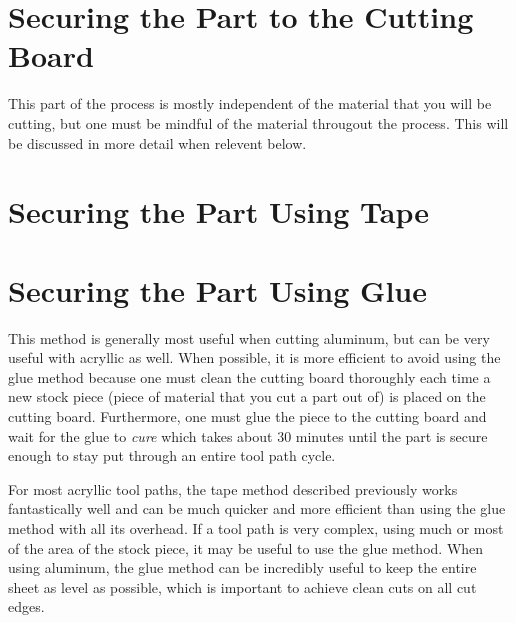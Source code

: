 \documentclass{article}
\begin{document}
\section{Securing the Part to the Cutting Board}
This part of the process is mostly independent of the material that you will be cutting, but one must be mindful of the material througout the 
process. This will be discussed in more detail when relevent below.

\section{Securing the Part Using Tape}

\section{Securing the Part Using Glue}
This method is generally most useful when cutting aluminum, but can be very useful with acryllic as well. When possible, it is more efficient to avoid 
using the glue method because one must clean the cutting board thoroughly each time a new stock piece (piece of material that you cut a part out of) is 
placed on the cutting board. Furthermore, one must glue the piece to the cutting board and wait for the glue to \textit{cure} which takes about 30
minutes until the part is secure enough to stay put through an entire tool path cycle.

For most acryllic tool paths, the tape method described previously works fantastically well and can be much quicker and more efficient than using the 
glue method with all its overhead. If a tool path is very complex, using much or most of the area of the stock piece, it may be useful to use the glue
method. When using aluminum, the glue method can be incredibly useful to keep the entire sheet as level as possible, which is important to achieve 
clean cuts on all cut edges.
\end{document}

